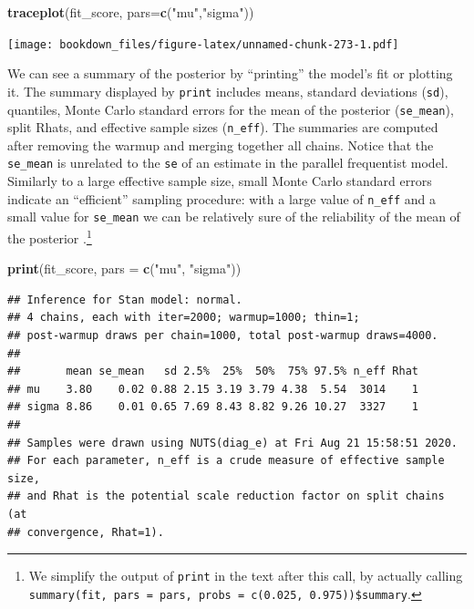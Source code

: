 \documentclass[12pt,]{krantz}
\newenvironment{Shaded}{\begin{snugshade}}{\end{snugshade}}
\newcommand{\KeywordTok}[1]{\textcolor[rgb]{0.13,0.29,0.53}{\textbf{#1}}}
\newcommand{\DataTypeTok}[1]{\textcolor[rgb]{0.13,0.29,0.53}{#1}}
\newcommand{\StringTok}[1]{\textcolor[rgb]{0.31,0.60,0.02}{#1}}
\newcommand{\NormalTok}[1]{#1}
\theoremstyle{definition}
\theoremstyle{definition}
\theoremstyle{definition}
\theoremstyle{remark}
\begin{document}
\begin{Shaded}
\begin{Highlighting}[]
\KeywordTok{traceplot}\NormalTok{(fit_score, }\DataTypeTok{pars=}\KeywordTok{c}\NormalTok{(}\StringTok{"mu"}\NormalTok{,}\StringTok{"sigma"}\NormalTok{))}
\end{Highlighting}
\end{Shaded}

\texttt{[image: bookdown\_files/figure-latex/unnamed-chunk-273-1.pdf]}

We can see a summary of the posterior by ``printing'' the model's fit or
plotting it. The summary displayed by \texttt{print} includes means,
standard deviations (\texttt{sd}), quantiles, Monte Carlo standard
errors for the mean of the posterior (\texttt{se\_mean}), split Rhats,
and effective sample sizes (\texttt{n\_eff}). The summaries are computed
after removing the warmup and merging together all chains. Notice that
the \texttt{se\_mean} is unrelated to the \texttt{se} of an estimate in
the parallel frequentist model. Similarly to a large effective sample
size, small Monte Carlo standard errors indicate an ``efficient''
sampling procedure: with a large value of \texttt{n\_eff} and a small
value for \texttt{se\_mean} we can be relatively sure of the reliability
of the mean of the posterior
\citep{vehtari2019ranknormalization}.\footnote{We simplify the output of
  \texttt{print} in the text after this call, by actually calling
  \texttt{summary(fit,\ pars\ =\ pars,\ probs\ =\ c(0.025,\ 0.975))\$summary}.}

\begin{Shaded}
\begin{Highlighting}[]
\KeywordTok{print}\NormalTok{(fit_score, }\DataTypeTok{pars =} \KeywordTok{c}\NormalTok{(}\StringTok{"mu"}\NormalTok{, }\StringTok{"sigma"}\NormalTok{))}
\end{Highlighting}
\end{Shaded}

\begin{verbatim}
## Inference for Stan model: normal.
## 4 chains, each with iter=2000; warmup=1000; thin=1; 
## post-warmup draws per chain=1000, total post-warmup draws=4000.
## 
##       mean se_mean   sd 2.5%  25%  50%  75% 97.5% n_eff Rhat
## mu    3.80    0.02 0.88 2.15 3.19 3.79 4.38  5.54  3014    1
## sigma 8.86    0.01 0.65 7.69 8.43 8.82 9.26 10.27  3327    1
## 
## Samples were drawn using NUTS(diag_e) at Fri Aug 21 15:58:51 2020.
## For each parameter, n_eff is a crude measure of effective sample size,
## and Rhat is the potential scale reduction factor on split chains (at 
## convergence, Rhat=1).
\end{verbatim}
\end{document}
